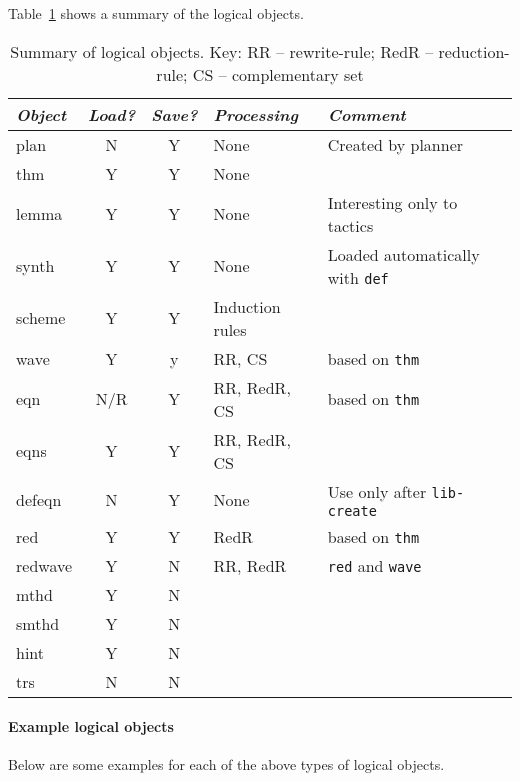 Table~\ref{tab:losum} shows a summary of the logical objects.
\begin{table}
\begin{tabular}{|l|c|c|l|l|}\hline
{\sl Object} & {\sl Load?} & {\sl Save?} & {\sl Processing} & {\sl Comment}\\\hline
plan &     N   &  Y    &     None       & Created by planner\\
thm  &     Y   &  Y    &     None   & \\
lemma &    Y   &  Y    &     None   & Interesting only to tactics\\
synth &    Y   &  Y    &     None  & Loaded automatically with {\tt def} \\
scheme &   Y   &  Y    & Induction rules & \\
wave   &   Y   &  y    & RR, CS & based on {\tt thm}\\
eqn    &   N/R &  Y    & RR, RedR, CS & based on {\tt thm}\\
eqns   &   Y   &  Y    & RR, RedR, CS & \\
defeqn &   N   &  Y    & None   & Use only after {\tt lib-create}\\
red    &   Y   &  Y    & RedR   & based on {\tt thm}\\
redwave &  Y   &  N    & RR, RedR & {\tt red} and {\tt wave}\\
mthd    &  Y  & N & &\\
smthd    &  Y  & N & &\\
hint    &  Y  & N & &\\
trs    &  N  & N & &\\\hline
\end{tabular}
\label{tab:losum}
\caption {Summary of logical objects.  Key: RR -- rewrite-rule; RedR -- reduction-rule; CS -- complementary set}
\end{table}




\paragraph {Example logical objects} 
Below are some examples for each of the above types of logical
objects.

